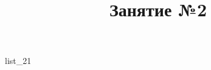\documentclass[12pt, a4paper]{article}
\begin{document}
	\title{Занятие №2}
	{list_21}
\end{document}
